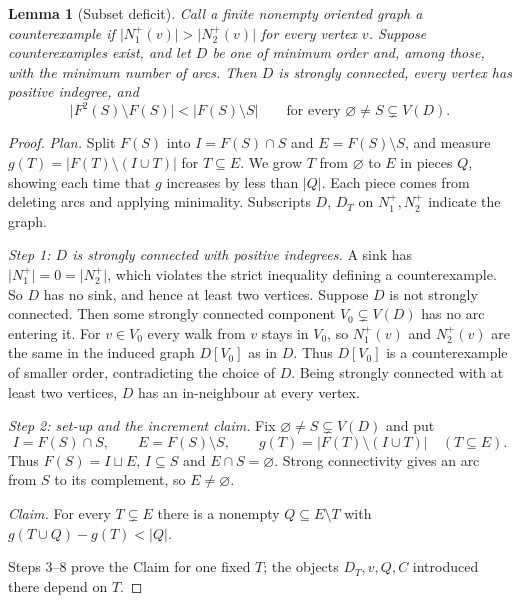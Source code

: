 \documentclass[11pt]{article}
\newtheorem{lemma}[theorem]{Lemma}
\theoremstyle{remark}
\newcommand{\abs}[1]{\lvert #1\rvert}
\begin{document}
\begin{lemma}[Subset deficit]
\label{lem:subset-deficit}
Call a finite nonempty oriented graph a \emph{counterexample} if
$\abs{N_1^+(v)}>\abs{N_2^+(v)}$ for every vertex $v$.  Suppose
counterexamples exist, and let $D$ be one of minimum order and, among those,
with the minimum number of arcs.  Then $D$ is strongly connected,
every vertex has positive indegree, and
\begin{equation}
\label{eq:subset-deficit}
  \abs{F^2(S)\setminus F(S)}<\abs{F(S)\setminus S}
  \qquad\text{for every }\varnothing\ne S\subsetneq V(D).
\end{equation}
\end{lemma}

\begin{proof}
\emph{Plan.}  Split $F(S)$ into $I=F(S)\cap S$ and $E=F(S)\setminus S$, and
measure $g(T)=\abs{F(T)\setminus(I\cup T)}$ for $T\subseteq E$.  We grow $T$
from $\varnothing$ to $E$ in pieces $Q$, showing each time that $g$ increases
by less than $\abs Q$.  Each piece comes from deleting arcs and applying
minimality.  Subscripts $D$, $D_T$ on $N_1^+,N_2^+$ indicate the graph.

\smallskip\noindent\emph{Step 1: $D$ is strongly connected with positive
indegrees.}
A sink has $\abs{N_1^+}=0=\abs{N_2^+}$, which violates the strict inequality
defining a counterexample.  So $D$ has no sink, and hence at least two
vertices.  Suppose $D$ is not strongly connected.  Then some strongly
connected component $V_0\subsetneq V(D)$ has no arc entering it.  For
$v\in V_0$ every walk from $v$ stays in $V_0$, so $N_1^+(v)$ and $N_2^+(v)$
are the same in the induced graph $D[V_0]$ as in $D$.  Thus $D[V_0]$ is a
counterexample of smaller order, contradicting the choice of $D$.  Being
strongly connected with at least two vertices, $D$ has an in-neighbour at
every vertex.

\smallskip\noindent\emph{Step 2: set-up and the increment claim.}
Fix $\varnothing\ne S\subsetneq V(D)$ and put
\[
  I=F(S)\cap S,\qquad E=F(S)\setminus S,
  \qquad g(T)=\abs{F(T)\setminus(I\cup T)}\quad(T\subseteq E).
\]
Thus $F(S)=I\sqcup E$, $I\subseteq S$ and $E\cap S=\varnothing$.  Strong
connectivity gives an arc from $S$ to its complement, so $E\ne\varnothing$.

\emph{Claim.} For every $T\subsetneq E$ there is a nonempty
$Q\subseteq E\setminus T$ with $g(T\cup Q)-g(T)<\abs Q$.

Steps 3--8 prove the Claim for one fixed $T$; the objects $D_T,v,Q,C$
introduced there depend on $T$.


\end{proof}
\end{document}

